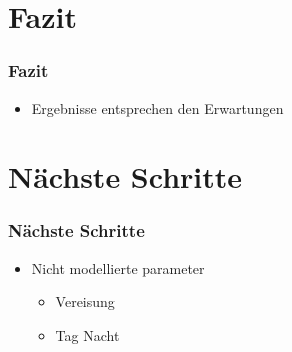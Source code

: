 \documentclass{beamer}
\begin{document}
\section{Fazit}
\begin{frame}
\frametitle{Fazit}
\begin{itemize}

	\item[] Ergebnisse entsprechen den Erwartungen

	
\end{itemize}
\end{frame}

\section{Nächste Schritte}
\begin{frame}
\frametitle{Nächste Schritte}
\begin{itemize}

	\item[] Nicht modellierte parameter
	\begin{itemize}
		\item[] Vereisung	
		\item[] Tag Nacht	
	\end{itemize}
	
\end{itemize}
\end{frame}
\end{document}
